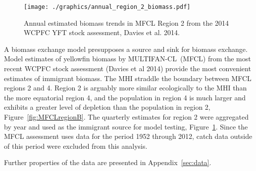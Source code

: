 \documentclass[12pt,letterpaper,twoside]{article}
\newcommand\MFCL{MULTIFAN-CL}
\begin{document}
\begin{figure}[t]
\begin{center}
\texttt{[image: ./graphics/annual\_region\_2\_biomass.pdf]}
\caption{\label{fig:r2biomass}
Annual estimated biomass trends in MFCL Region 2 from the 2014 WCPFC YFT
stock assessment, Davies et al. 2014.
}
\end{center}
\end{figure}
A biomass exchange model presupposes a source and sink for biomass
exchange.
Model estimates of yellowfin biomass by \MFCL\ (MFCL)
from the most recent WCPFC stock assessment (Davies et al 2014) 
provide the most convenient estimates of immigrant biomass. 
The MHI straddle the boundary between MFCL regions 2 and 4.
Region 2 is arguably
more similar ecologically to the MHI than the more equatorial region
4, and the population in region 4 is much larger and exhibits a greater level
of depletion than the population in region 2, Figure~\ref{fig:MFCLregionB}.
The quarterly estimates for
region 2 were aggregated by year and used as the immigrant source for
model testing, Figure~\ref{fig:r2biomass}.
Since the MFCL assessment uses data for the period 1952 through 2012,
catch data outside of this period were excluded from this analysis.

\vspace{2ex}
Further properties of the data are presented in Appendix~\ref{sec:data}. 
\end{document}
